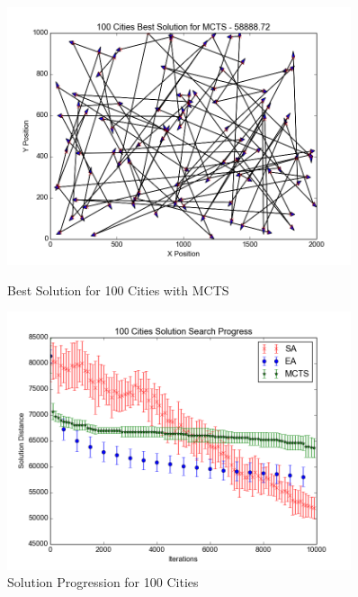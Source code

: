 \begin{figure}[H]
\begin{minipage}{0.45\textwidth}
        \centering
        \includegraphics[width=0.9\textwidth]{100City_MCTS.png} %
        \caption{Best Solution for 100 Cities with MCTS}
        \label{fig:100city_MCTS}
    \end{minipage}\hfill
    \begin{minipage}{0.45\textwidth}
		\centering
		\includegraphics[width=0.9\textwidth]{100City_Solutions.png}
		\caption{Solution Progression for 100 Cities}
		\label{fig:100city_Solution}
    \end{minipage}\hfill
\end{figure}

